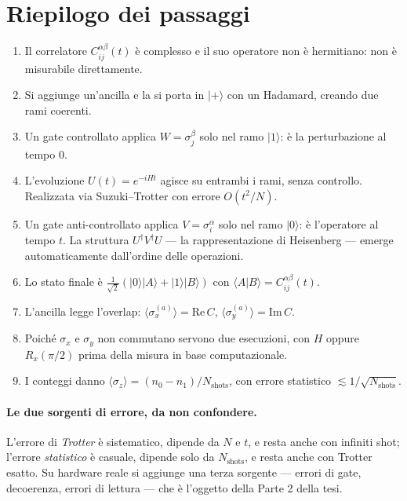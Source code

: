 \documentclass[11pt,a4paper]{article}
\begin{document}
\clearpage
\section{Riepilogo dei passaggi}

\begin{enumerate}[leftmargin=*]
\item Il correlatore $C_{ij}^{\alpha\beta}(t)$ è complesso e il suo operatore non è hermitiano:
non è misurabile direttamente.
\item Si aggiunge un'ancilla e la si porta in $|+\rangle$ con un Hadamard, creando due rami
coerenti.
\item Un gate controllato applica $W=\sigma_j^\beta$ solo nel ramo $|1\rangle$: è la
perturbazione al tempo $0$.
\item L'evoluzione $U(t)=e^{-iHt}$ agisce su entrambi i rami, senza controllo. Realizzata via
Suzuki--Trotter con errore $O(t^2/N)$.
\item Un gate anti-controllato applica $V=\sigma_i^\alpha$ solo nel ramo $|0\rangle$: è
l'operatore al tempo $t$. La struttura $U^\dagger V^\dagger U$ --- la rappresentazione di
Heisenberg --- emerge automaticamente dall'ordine delle operazioni.
\item Lo stato finale è $\tfrac{1}{\sqrt2}(|0\rangle|A\rangle+|1\rangle|B\rangle)$ con
$\langle A|B\rangle=C_{ij}^{\alpha\beta}(t)$.
\item L'ancilla legge l'overlap: $\langle\sigma_x^{(a)}\rangle=\mathrm{Re}\,C$,
$\langle\sigma_y^{(a)}\rangle=\mathrm{Im}\,C$.
\item Poiché $\sigma_x$ e $\sigma_y$ non commutano servono due esecuzioni, con $H$ oppure
$R_x(\pi/2)$ prima della misura in base computazionale.
\item I conteggi danno $\langle\sigma_z\rangle=(n_0-n_1)/N_{\text{shots}}$, con errore
statistico $\lesssim1/\sqrt{N_{\text{shots}}}$.
\end{enumerate}

\paragraph{Le due sorgenti di errore, da non confondere.}
L'errore di \emph{Trotter} è sistematico, dipende da $N$ e $t$, e resta anche con infiniti shot;
l'errore \emph{statistico} è casuale, dipende solo da $N_{\text{shots}}$, e resta anche con
Trotter esatto. Su hardware reale si aggiunge una terza sorgente --- errori di gate,
decoerenza, errori di lettura --- che è l'oggetto della Parte 2 della tesi.
\end{document}
